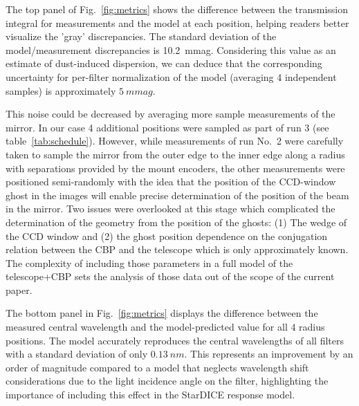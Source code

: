 The top panel of Fig.~\ref{fig:metrics} shows the difference between
the transmission integral for measurements and the model at each
position, helping readers better visualize the 'gray'
discrepancies. The standard deviation of the model/measurement
discrepancies is \SI{10.2}{mmag}. Considering this value as an
estimate of dust-induced dispersion, we can deduce that the
corresponding uncertainty for per-filter normalization of the model
(averaging 4 independent samples) is approximately $\SI{5}{mmag}$.

This noise could be decreased by averaging more sample measurements of
the mirror. In our case 4 additional positions were sampled as part
of run 3 (see table~\ref{tab:schedule}). However, while measurements of run No.~2 were carefully taken to sample the mirror from the outer
edge to the inner edge along a radius with separations provided by the
mount encoders, the other measurements were positioned semi-randomly
with the idea that the position of the CCD-window ghost in the images
will enable precise determination of the position of the beam in the
mirror. Two issues were overlooked at this stage which complicated the
determination of the geometry from the position of the ghosts: (1) The
wedge of the CCD window and (2) the ghost position dependence on the
conjugation relation between the CBP and the telescope which is only
approximately known. The complexity of including those parameters in a
full model of the telescope+CBP sets the analysis of those data out of
the scope of the current paper.

The bottom panel in Fig.~\ref{fig:metrics} displays the difference
between the measured central wavelength and the model-predicted value
for all 4 radius positions. The model accurately reproduces the
central wavelengths of all filters with a standard deviation of only
$\SI{0.13}{nm}$. This represents an improvement by an order of
magnitude compared to a model that neglects wavelength shift
considerations due to the light incidence angle on the filter, highlighting the importance of including this effect
in the StarDICE response model.


